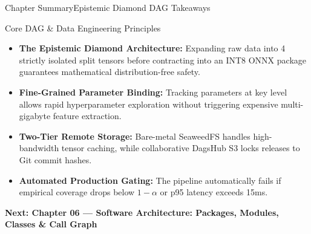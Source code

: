 \begin{frame}{Chapter Summary}{Epistemic Diamond DAG Takeaways}
    \begin{block}{Core DAG \& Data Engineering Principles}
        \begin{itemize}\small
            \item \textbf{The Epistemic Diamond Architecture:} Expanding raw data into 4 strictly isolated split tensors before contracting into an INT8 ONNX package guarantees mathematical distribution-free safety.
            \item \textbf{Fine-Grained Parameter Binding:} Tracking parameters at key level allows rapid hyperparameter exploration without triggering expensive multi-gigabyte feature extraction.
            \item \textbf{Two-Tier Remote Storage:} Bare-metal SeaweedFS handles high-bandwidth tensor caching, while collaborative DagsHub S3 locks releases to Git commit hashes.
            \item \textbf{Automated Production Gating:} The pipeline automatically fails if empirical coverage drops below $1 - \alpha$ or p95 latency exceeds 15ms.
        \end{itemize}
    \end{block}

    \vspace{0.2cm}
    \begin{center}
        \textcolor{deepblue}{\textbf{Next: Chapter 06 --- Software Architecture: Packages, Modules, Classes \& Call Graph}}
    \end{center}

\end{frame}
